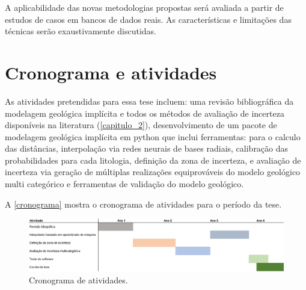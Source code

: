 A aplicabilidade das novas metodologias propostas será avaliada a partir de estudos de casos em bancos de dados reais. As características e limitações das técnicas serão exaustivamente discutidas.

\section{Cronograma e atividades}

As atividades pretendidas para essa tese incluem: uma revisão bibliográfica da modelagem geológica implícita e todos os métodos de avaliação de incerteza disponíveis na literatura (\autoref{capitulo_2}), desenvolvimento de um pacote de modelagem geológica implícita em python que inclui ferramentas: para o calculo das distâncias, interpolação via redes neurais de bases radiais, calibração das probabilidades para cada litologia, definição da zona de incerteza, e avaliação de incerteza via geração de múltiplas realizações equiprováveis do modelo geológico multi categórico e ferramentas de validação do modelo geológico.

A \autoref{cronograma} mostra o cronograma de atividades para o período da tese.

\begin{figure}[H]
	\caption{\label{cronograma}Cronograma de atividades.}
	\begin{center}
		\includegraphics[width=\textwidth]{capitulo_3/cronograma_novo.png}
	\end{center}
\end{figure}